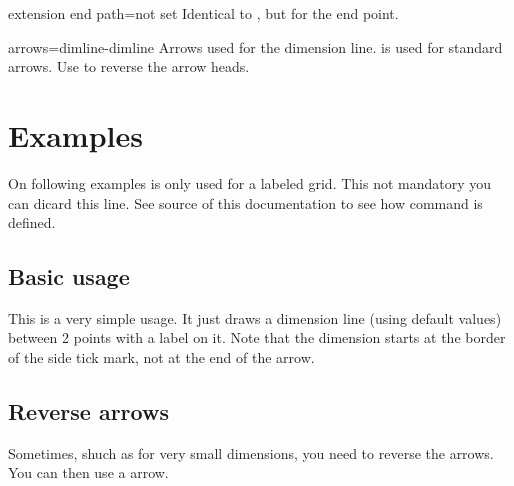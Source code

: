 \documentclass[a4paper]{article}
\makeatletter
\newcommand{\helpgrid@do@nothing}[1]{#1}%
\newcommand{\helpgrid}[4]{%
  \pgfplotsifinaxis{%
    \let\helpgrid@internal\pgfplotsextra%
  }{%
    \let\helpgrid@internal\helpgrid@do@nothing%
  }%

  \begin{scope}

    \coordinate (a) at (#1,#2) {};
    \coordinate (b) at (#3,#4) {};

    \draw[step=1,gray!10,very thin] (a) grid (b);
    
    \foreach \x in {#1,...,#3}
    \node[anchor=north,gray!20] at (\x, 0) {\tiny{\x}};

    \foreach \y in {#2,...,#4}
    \node[anchor=east,gray!20] at (0, \y) {\texttt{\tiny{$\y$}}};
  \end{scope}
}%
\makeatother
\begin{document}
\begin{docKey}{extension end path}{=}{not set}
  Identical to , but for the end point.
\end{docKey}


\begin{docKey}{arrows}{=}{dimline-dimline}
  Arrows used for the dimension line.  is used
  for standard arrows. Use  to
  reverse the arrow heads.
\end{docKey}



\section{Examples}

On following examples  is only used for a labeled
grid. This not mandatory you can dicard this line. See source of this
documentation to see how  command is defined.



\subsection{Basic usage}

This is a very simple usage. It just draws a dimension line (using default
values) between 2 points with a label on it. Note that the dimension starts
at the border of the side tick mark, not at the end of the arrow.

\begin{exampleB}{}
\end{exampleB}


\subsection{Reverse arrows}

Sometimes, shuch as for very small dimensions, you need to reverse the
arrows. You can then use a  arrow.
\end{document}
